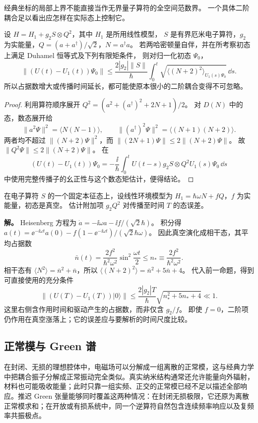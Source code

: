 经典坐标的局部上界不能直接当作无界量子算符的全空间范数界。
一个具体二阶耦合足以看出应怎样在实际态上控制它。
\begin{proposition}[二阶单模耦合的态上误差界]
设 $H=H_1+g_2S\otimes Q^2$，其中 $H_1$ 是所用线性模型，
$S$ 是有界厄米电子算符，$g_2$ 为实能量，$Q=(a+a^\dagger)/\sqrt2$，$N=a^\dagger a$。
若两哈密顿量自伴，并在所考察初态上满足 Duhamel 恒等式及下列有限矩条件，
则对归一化初态 $\Psi_0$，
\[
\|(U(t)-U_1(t))\Psi_0\|
\le\frac{2|g_2|\|S\|}{\hbar}
\int_0^t\sqrt{\langle(N+2)^2\rangle_{U_1(s)\Psi_0}}\,\dd s.
\]
所以占据数增大或传播时间延长，都可能使原本很小的二阶耦合变得不可忽略。
\end{proposition}
\begin{proof}
利用算符顺序展开
$Q^2=(a^2+(a^\dagger)^2+2N+1)/2$。
对 $D(N)$ 中的态，数态展开给
\[
\|a^2\Psi\|^2=\langle N(N-1)\rangle,\qquad
\|(a^\dagger)^2\Psi\|^2=\langle(N+1)(N+2)\rangle.
\]
两者均不超过 $\|(N+2)\Psi\|^2$，而
$\|(2N+1)\Psi\|\le2\|(N+2)\Psi\|$。
故 $\|Q^2\Psi\|\le2\|(N+2)\Psi\|$。
在
\[
(U(t)-U_1(t))\Psi_0
=-\frac{\ii}{\hbar}\int_0^t
U(t-s)g_2S\otimes Q^2U_1(s)\Psi_0\,\dd s
\]
中使用完整传播子的幺正性与这个数态矩估计，便得结论。
\end{proof}

\begin{exbox}[受驱振子的占据数怎样进入线性化条件]
在电子算符 $S$ 的一个固定本征态上，设线性环境模型为
$H_1=\hbar\omega N+fQ$，$f$ 为实能量，初态是真空。
估计附加项 $g_2Q^2$ 对传播至时间 $T$ 的态误差。

\textbf{解。} Heisenberg 方程为
$\dot a=-\ii\omega a-\ii f/(\sqrt2\hbar)$。
积分得
$a(t)=\ee^{-\ii\omega t}a(0)-f(1-\ee^{-\ii\omega t})/(\sqrt2\hbar\omega)$。
因此真空演化成相干态，其平均占据数
\[
\bar n(t)=\frac{2f^2}{\hbar^2\omega^2}\sin^2\frac{\omega t}{2}
\le n_*\equiv\frac{2f^2}{\hbar^2\omega^2}.
\]
相干态有 $\langle N^2\rangle=\bar n^2+\bar n$，所以
$\langle(N+2)^2\rangle=\bar n^2+5\bar n+4$。
代入前一命题，得到可直接使用的充分条件
\[
\|(U(T)-U_1(T))|0\rangle\|
\le\frac{2|g_2|T}{\hbar}\sqrt{n_*^2+5n_*+4}\ll1.
\]
这里右侧含作用时间和驱动产生的占据数，而非仅含 $g_2/f$。
即使 $f=0$，二阶项仍作用在真空涨落上；它的误差应与要解析的时间尺度比较。
\end{exbox}


\subsection{正常模与 Green 谱}

在封闭、无损的理想腔体中，电磁场可以分解成一组离散的正常模，这与经典力学中把耦合振子分解成正常振动完全类似。真实纳米结构通常还允许能量向外辐射，材料也可能吸收能量；此时只靠一组实频、正交的正常模已经不足以描述全部响应。推迟 Green 张量能够同时覆盖这两种情况：在封闭无损极限，它还原为离散正常模求和；在开放或有损系统中，同一个逆算符自然包含连续频率响应以及复频率共振极点。

